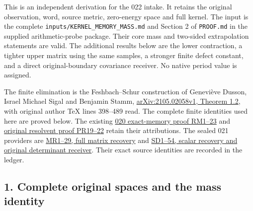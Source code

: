 \documentclass[11pt]{article}
\begin{document}
This is an independent derivation for the 022 intake. It retains the original observation, word, source metric, zero-energy space and full kernel. The input is the complete \texttt{inputs/KERNEL\_MEMORY\_MASS.md} and Section 2 of \texttt{PROOF.md} in the supplied arithmetic-probe package. Their core mass and two-sided extrapolation statements are valid. The additional results below are the lower contraction, a tighter upper matrix using the same samples, a stronger finite defect constant, and a direct original-boundary covariance receiver. No native period value is assigned.

The finite elimination is the Feshbach--Schur construction of Geneviève Dusson, Israel Michael Sigal and Benjamin Stamm, \href{https://arxiv.org/abs/2105.02058v1}{arXiv:2105.02058v1, Theorem 1.2}, with original author TeX lines 398--489 read. The complete finite identities used here are proved below. The existing \href{https://github.com/KokunoYumeto/zeta-function-research-reader/blob/13ca9b136fcdae48df7454bd9bf99e1ef22dd03c/workbenches/splitzero-tandem/continuations/20260922-original-growth-resolvent/ORIGINAL_RESOLVENT_MEMORY_PROOFS.md}{020 exact-memory proof RM1--23} and \href{https://github.com/KokunoYumeto/zeta-function-research-reader/blob/13ca9b136fcdae48df7454bd9bf99e1ef22dd03c/workbenches/splitzero-tandem/continuations/20260922-original-growth-resolvent/RECEIVED_RESOLVENT_PROOFS.md}{original resolvent proof PR19--22} retain their attributions. The sealed 021 providers are \href{https://github.com/KokunoYumeto/zeta-function-research-reader/blob/e40b46fde72c245dd79ef5691f59c21d6cbf0c75/workbenches/splitzero-tandem/continuations/20260922-original-observation-recovery/MATRIX_RECOVERY_PROOFS.md}{MR1--29, full matrix recovery} and \href{https://github.com/KokunoYumeto/zeta-function-research-reader/blob/e40b46fde72c245dd79ef5691f59c21d6cbf0c75/workbenches/splitzero-tandem/continuations/20260922-original-observation-recovery/SCALAR_RECOVERY_PROOFS.md}{SD1--54, scalar recovery and original determinant receiver}. Their exact source identities are recorded in the ledger.

\subsection{1. Complete original spaces and the mass identity}\label{complete-original-spaces-and-the-mass-identity}
\end{document}
